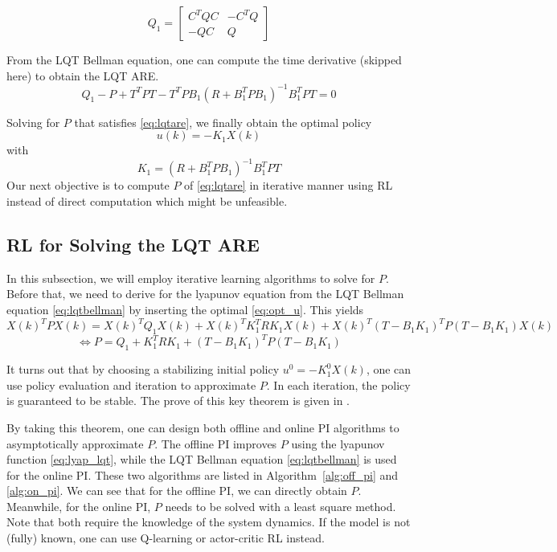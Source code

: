 \begin{equation}
Q_1 = \left[ \begin{array}{cc}
C^TQC & -C^TQ \\ 
-QC & Q
\end{array} \right] 
\end{equation}

From the LQT Bellman equation, one can compute the time derivative (skipped here) to obtain the LQT ARE.
\begin{equation}
\label{eq:lqtare}
Q_1 - P + T^TPT - T^TPB_1(R+B_1^TPB_1)^{-1}B_1^TPT = 0
\end{equation}

Solving for $P$ that satisfies \eqref{eq:lqtare}, we finally obtain the optimal policy 
\begin{equation}
\label{eq:opt_u}
u(k) = -K_1X(k)
\end{equation}
with
\begin{equation}
K_1 = (R+B_1^TPB_1)^{-1}B_1^TPT
\end{equation}
Our next objective is to compute $P$ of \eqref{eq:lqtare} in iterative manner using \ac {RL} instead of direct computation which might be unfeasible. 

\subsection{\ac{RL} for Solving the LQT ARE}
In this subsection, we will employ iterative learning algorithms to solve for $P$. Before that, we need to derive for the lyapunov equation from the LQT Bellman equation \eqref{eq:lqtbellman} by inserting the optimal \eqref{eq:opt_u}. This yields
\begin{equation*}
X(k)^TPX(k) =  X(k)^TQ_1X(k) + X(k)^TK_1^TRK_1X(k) + X(k)^T(T - B_1K_1)^TP(T - B_1K_1)X(k)
\end{equation*}
\begin{equation}
\label{eq:lyap_lqt}
\Leftrightarrow  P =  Q_1 + K_1^TRK_1 + (T - B_1K_1)^TP(T - B_1K_1)
\end{equation}

It turns out that by choosing a stabilizing initial policy $u^0 = -K_1^0X(k)$, one can use policy evaluation and iteration to approximate $ P $. In each iteration, the policy is guaranteed to be stable. The prove of this key theorem is given in \cite{1099755}. 

By taking this theorem, one can design both offline and online \ac{PI} algorithms to asymptotically approximate $P$. The offline \ac{PI} improves $P$ using the lyapunov function \eqref{eq:lyap_lqt}, while the LQT Bellman equation \eqref{eq:lqtbellman} is used for the online \ac{PI}. These two algorithms are listed in Algorithm~\ref{alg:off_pi} and \ref{alg:on_pi}. We can see that for the offline \ac{PI}, we can directly obtain $P$. Meanwhile, for the online \ac{PI}, $P$ needs to be solved with a least square method. Note that both require the knowledge of the system dynamics. If the model is not (fully) known, one can use Q-learning \cite{Kiumarsi20141167} or actor-critic \ac {RL} \cite{Modares20141780} instead. 

